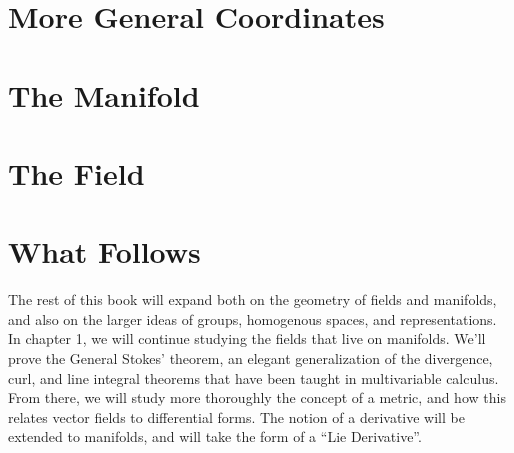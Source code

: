\documentclass[../master.tex]{subfiles}
\begin{document}
	
	
	
	\section{More General Coordinates} %
	\label{sec:GeneralCoordinates}
	
	
	\section{The Manifold} %
	\label{sec:the_manifold}
	
	
	\section{The Field} %
	\label{sec:the_field}
	
	\section{What Follows} %
	\label{sec:what_follows}
	
	The rest of this book will expand both on the geometry of fields and manifolds, and also on the larger ideas of groups, homogenous spaces, and representations. \\
	
	In chapter 1, we will continue studying the fields that live on manifolds. We'll prove the General Stokes' theorem, an elegant generalization of the divergence, curl, and line integral theorems that have been taught in multivariable calculus. From there, we will study more thoroughly the concept of a metric, and how this relates vector fields to differential forms. The notion of a derivative will be extended to manifolds, and will take the form of a ``Lie Derivative''.\\
	
\end{document}
